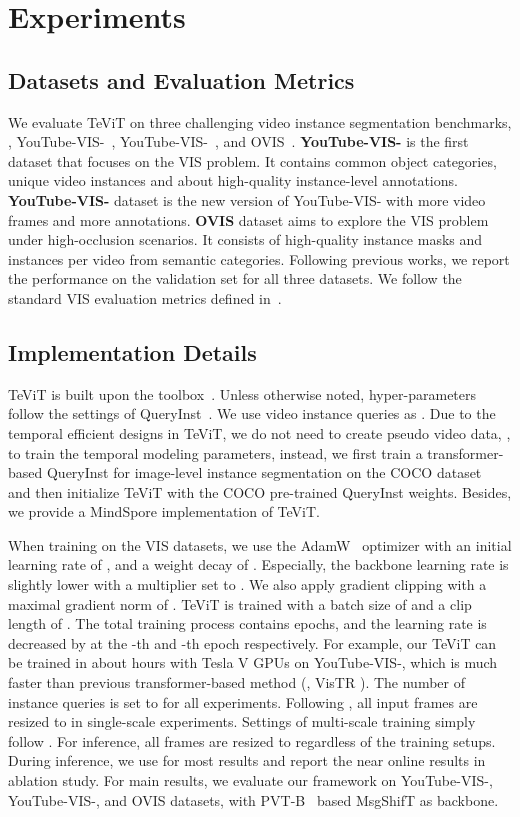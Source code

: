 \documentclass[10pt,twocolumn,letterpaper]{article}
\begin{document}
\section{Experiments}

\subsection{Datasets and Evaluation Metrics}
We evaluate TeViT on three challenging video instance segmentation benchmarks, \ie, YouTube-VIS-~\cite{vis}, YouTube-VIS-~\cite{vis2021}, and OVIS~\cite{ovis}.
\textbf{YouTube-VIS-} is the first dataset that focuses on the VIS problem. It contains  common object categories,  unique video instances and about  high-quality instance-level annotations.
\textbf{YouTube-VIS-} dataset is the new version of YouTube-VIS- with  more video frames and  more annotations.
\textbf{OVIS} dataset aims to explore the VIS problem under high-occlusion scenarios. It consists of  high-quality instance masks and  instances per video from  semantic categories.
Following previous works, we report the performance on the validation set for all three datasets.
We follow the standard VIS evaluation metrics defined in~\cite{vis}.

\subsection{Implementation Details}
TeViT is built upon the  toolbox~\cite{mmdetection}.
Unless otherwise noted, hyper-parameters follow the settings of QueryInst~\cite{queryinst}.
We use  video instance queries as \cite{ifc, queryinst}.
Due to the temporal efficient designs in TeViT, we do not need to create pseudo video data, \eg \cite{stemseg, ifc}, to train the temporal modeling parameters, instead, we first train a transformer-based QueryInst for image-level instance segmentation on the COCO dataset~\cite{mscoco} and then initialize TeViT with the COCO pre-trained QueryInst weights. Besides, we provide a MindSpore \cite{mindspore} implementation of TeViT.

When training on the VIS datasets, we use the AdamW~\cite{adam} optimizer with an initial learning rate of , and a weight decay of . Especially, the backbone learning rate is slightly lower with a multiplier set to . We also apply gradient clipping with a maximal gradient norm of . TeViT is trained with a batch size of  and a clip length of . The total training process contains  epochs, and the learning rate is decreased by  at the -th and -th epoch respectively.
For example, our TeViT can be trained in about  hours with  Tesla V GPUs on YouTube-VIS-, which is much faster than previous transformer-based method (\ie, VisTR \cite{vistr}).
The number of instance queries  is set to  for all experiments. Following \cite{vis}, all input frames are resized to  in single-scale experiments. Settings of multi-scale training simply follow \cite{sipmask}. For inference, all frames are resized to  regardless of the training setups. During inference, we use  for most results and report the near online results in ablation study. For main results, we evaluate our framework on YouTube-VIS-, YouTube-VIS-, and OVIS datasets, with PVT-B~\cite{pvtv2} based MsgShifT as backbone.
\end{document}
